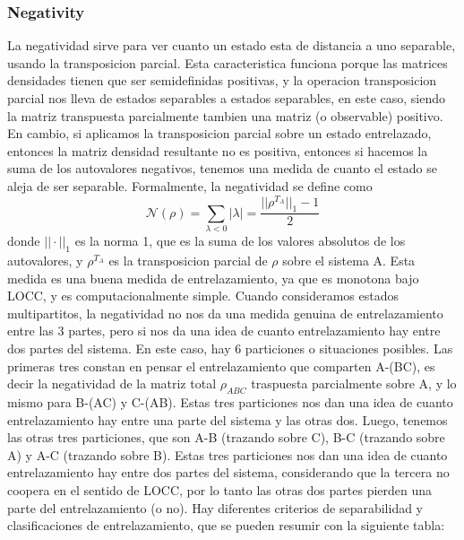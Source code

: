 \subsubsection{Negativity}\label{subsubsec:negativity}
La negatividad sirve para ver cuanto un estado esta de distancia a uno separable, usando la transposicion parcial. Esta caracteristica funciona porque las matrices densidades tienen que ser semidefinidas positivas, y la operacion transposicion parcial nos lleva de estados separables a estados separables, en este caso, siendo la matriz transpuesta parcialmente tambien una matriz (o observable) positivo. En cambio, si aplicamos la transposicion parcial sobre un estado entrelazado, entonces la matriz densidad resultante no es positiva, entonces si hacemos la suma de los autovalores negativos, tenemos una medida de cuanto el estado se aleja de ser separable. Formalmente, la negatividad se define como
\begin{equation}
    \mathcal{N}(\rho)=\sum_{\lambda<0}|\lambda|=\frac{||\rho^{T_A}||_1-1}{2}
\end{equation}
donde $||\cdot||_1$ es la norma 1, que es la suma de los valores absolutos de los autovalores, y $\rho^{T_A}$ es la transposicion parcial de $\rho$ sobre el sistema A. Esta medida es una buena medida de entrelazamiento, ya que es monotona bajo LOCC, y es computacionalmente simple. Cuando consideramos estados multipartitos, la negatividad no nos da una medida genuina de entrelazamiento entre las 3 partes, pero si nos da una idea de cuanto entrelazamiento hay entre dos partes del sistema. En este caso, hay 6 particiones o situaciones posibles. Las primeras tres constan en pensar el entrelazamiento que comparten A-(BC), es decir la negatividad de la matriz total $\rho_{ABC}$ traspuesta parcialmente sobre A, y lo mismo para B-(AC) y C-(AB). Estas tres particiones nos dan una idea de cuanto entrelazamiento hay entre una parte del sistema y las otras dos. Luego, tenemos las otras tres particiones, que son A-B (trazando sobre C), B-C (trazando sobre A) y A-C (trazando sobre B). Estas tres particiones nos dan una idea de cuanto entrelazamiento hay entre dos partes del sistema, considerando que la tercera no coopera en el sentido de LOCC, por lo tanto las otras dos partes pierden una parte del entrelazamiento (o no). 
Hay diferentes criterios de separabilidad y clasificaciones de entrelazamiento, que se pueden resumir con la siguiente tabla:
